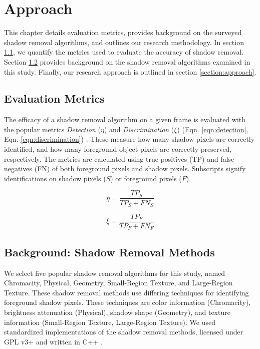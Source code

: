 \clearpage
\chapter{Approach}

This chapter details evaluation metrics, provides background on the surveyed shadow removal algorithms, and outlines our research methodology. In section \ref{section:eval_metrics}, we quantify the metrics used to evaluate the accuracy of shadow removal. Section \ref{section:removalmethods} provides background on the shadow removal algorithms examined in this study. Finally, our research approach is outlined in section \ref{section:approach}.

\section{Evaluation Metrics} \label{section:eval_metrics}

The efficacy of a shadow removal algorithm on a given frame is evaluated with the popular metrics \textit{Detection} ($\eta$) and \textit{Discrimination} ($\xi$) (Eqn. \ref{eqn:detection}, Eqn. \ref{eqn:discrimination}) \cite{prati2003detecting}. These measure how many shadow pixels are correctly identified, and how many foreground object pixels are correctly preserved, respectively. The metrics are calculated using true positives (TP) and false negatives (FN) of both foreground pixels and shadow pixels. Subscripts signify identifications on shadow pixels ($S$) or foreground pixels ($F$).

\begin{equation}
\eta = \dfrac{TP_{S}}{TP_{S} + FN_{S}} \label{eqn:detection}
\end{equation}

\begin{equation}
\xi = \dfrac{TP_{F}}{TP_{F} + FN_{F}} \label{eqn:discrimination}
\end{equation}

\section{Background: Shadow Removal Methods} \label{section:removalmethods}

We select five popular shadow removal algorithms for this study, named Chromacity, Physical, Geometry, Small-Region Texture, and Large-Region Texture. These shadow removal methods use differing techniques for identifying foreground shadow pixels. These techniques are color information (Chromacity), brightness attenuation (Physical), shadow shape (Geometry), and texture information (Small-Region Texture, Large-Region Texture). We used standardized implementations of the shadow removal methods, licensed under GPL v3+ and written in C++ \cite{shadowssourceforge}. 

